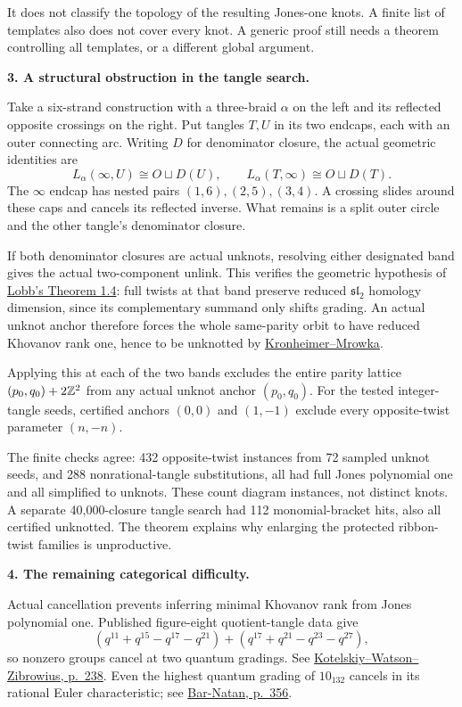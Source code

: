 \documentclass[11pt]{article}
\begin{document}
It does not classify the topology of the resulting Jones-one knots. A finite list of templates also does not cover every knot. A generic proof still needs a theorem controlling all templates, or a different global argument.

\newpage
\textbf{3. A structural obstruction in the tangle search.}

Take a six-strand construction with a three-braid $\alpha$ on the left and its reflected opposite crossings on the right. Put tangles $T,U$ in its two endcaps, each with an outer connecting arc. Writing $D$ for denominator closure, the actual geometric identities are
\[
L_\alpha(\infty,U)\cong O\sqcup D(U),\qquad
L_\alpha(T,\infty)\cong O\sqcup D(T).
\]
The $\infty$ endcap has nested pairs $(1,6),(2,5),(3,4)$. A crossing slides around these caps and cancels its reflected inverse. What remains is a split outer circle and the other tangle's denominator closure.

If both denominator closures are actual unknots, resolving either designated band gives the actual two-component unlink. This verifies the geometric hypothesis of
\href{https://arxiv.org/abs/1105.3985}{Lobb's Theorem 1.4}: full twists at that band preserve reduced $\mathfrak{sl}_2$ homology dimension, since its complementary summand only shifts grading. An actual unknot anchor therefore forces the whole same-parity orbit to have reduced Khovanov rank one, hence to be unknotted by
\href{https://arxiv.org/abs/1005.4346}{Kronheimer--Mrowka}.

Applying this at each of the two bands excludes the entire parity lattice
$(p_0,q_0)+2\mathbb Z^2$ from any actual unknot anchor $(p_0,q_0)$. For the tested integer-tangle seeds, certified anchors $(0,0)$ and $(1,-1)$ exclude every opposite-twist parameter $(n,-n)$.

The finite checks agree: 432 opposite-twist instances from 72 sampled unknot seeds, and 288 nonrational-tangle substitutions, all had full Jones polynomial one and all simplified to unknots. These count diagram instances, not distinct knots. A separate 40,000-closure tangle search had 112 monomial-bracket hits, also all certified unknotted. The theorem explains why enlarging the protected ribbon-twist families is unproductive.

\textbf{4. The remaining categorical difficulty.}

Actual cancellation prevents inferring minimal Khovanov rank from Jones polynomial one. Published figure-eight quotient-tangle data give
\[
(q^{11}+q^{15}-q^{17}-q^{21})
 +(q^{17}+q^{21}-q^{23}-q^{27}),
\]
so nonzero groups cancel at two quantum gradings. See
\href{https://doi.org/10.2140/obs.2022.5.223}{Kotelskiy--Watson--Zibrowius, p.~238}.
Even the highest quantum grading of $10_{132}$ cancels in its rational Euler characteristic; see
\href{https://arxiv.org/abs/math/0201043}{Bar-Natan, p.~356}.
\end{document}
